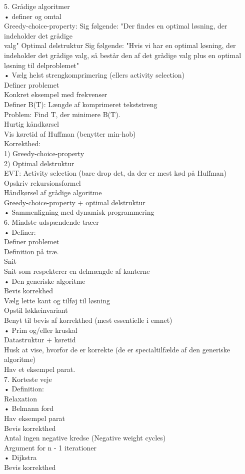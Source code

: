 \documentclass[11pt,a4paper]{report}
\theoremstyle{plain}
\theoremstyle{definition}
\theoremstyle{remark}
\numberwithin{equation}{section}
\begin{document}
5. Grådige algoritmer\\
 • definer og omtal\\
 	Greedy-choice-property: Sig følgende: "Der findes en optimal løsning, der indeholder det grådige \\ valg"
 	Optimal delstruktur Sig følgende: "Hvis vi har en optimal løsning, der indeholder det grådige valg, så består den af det grådige valg plus en optimal løsning til delproblemet"\\
 • Vælg helst strengkomprimering (ellers activity selection)\\
 	Definer problemet\\
 	Konkret eksempel med frekvenser\\
 	Definer B(T): Længde af komprimeret tekststreng\\
 	Problem: Find T, der minimere B(T).\\
 	Hurtig kåndkørsel\\
 	Vis køretid af Huffman (benytter min-hob)\\
 	Korrekthed:\\
 		1) Greedy-choice-property\\
 		2) Optimal delstruktur\\

EVT: Activity selection (bare drop det, da der er mest kød på Huffman)\\
	Opskriv rekursionsformel\\
	Håndkørsel af grådige algoritme\\
	Greedy-choice-property + optimal delstruktur\\

 • Sammenligning med dynamisk programmering\\

6. Mindste udspændende træer\\
 • Definer:\\
 	Definer problemet\\
 	Definition på træ.\\
 	Snit\\
 	Snit som respekterer en delmængde af kanterne\\
 • Den generiske algoritme\\
 	Bevis korrekhed\\
		Vælg lette kant og tilføj til løsning\\
		Opstil løkkeinvariant\\
		Benyt til bevis af korrekthed (mest essentielle i emnet)\\
 • Prim og/eller kruskal\\
 	Datastruktur + køretid\\
 	Husk at vise, hvorfor de er korrekte (de er specialtilfælde af den generiske algoritme)\\
 	Hav et eksempel parat.\\

7. Korteste veje\\
 • Definition:\\
 	Relaxation\\
 • Belmann ford\\
 	Hav eksempel parat\\
 	Bevis korrekthed\\
 	Antal ingen negative kredse (Negative weight cycles)\\
 	Argument for n - 1 iterationer\\
 • Dijkstra\\
 	Bevis korrekthed\\
\end{document}
